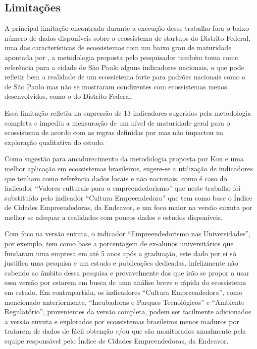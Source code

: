 \subsection{Limitações}
\label{subsection:limitações}

A principal limitação encontrada durante a execução desse trabalho fora o baixo número de dados disponíveis sobre o ecossistema de startups do Distrito Federal, uma das características de ecossistemas com um baixo grau de maturidade apontada por , a metodologia proposta pelo pesquisador também toma como referência para a cidade de São Paulo alguns indicadores nacionais, o que pode refletir bem a realidade de um ecossistema forte para padrões nacionais como o de São Paulo mas não se mostraram condizentes com ecossistemas menos desenvolvidos, como o do Distrito Federal.

Essa limitação refletiu na supressão de 13 indicadores sugeridos pela metodologia completa e impediu a mensuração de um nível de maturidade geral para o ecossistema de acordo com as regras definidas por  mas não impactou na exploração qualitativa do estudo.

Como sugestão para amadurecimento da metodologia proposta por Kon e uma melhor aplicação em ecossistemas brasileiros, sugere-se a utilização de indicadores que tenham como referência dados locais e não nacionais, como é caso do indicador ``Valores culturais para o empreendedorismo'' que neste trabalho foi substituído pelo indicador ``Cultura Empreendedora'' que tem como base o Índice de Cidades Empreendedoras, da Endeavor, e um foco maior na versão enxuta por melhor se adequar a realidades com poucos dados e estudos disponíveis. 

Com foco na versão enxuta, o indicador ``Empreendedorismo nas Universidades'', por exemplo, tem como base a porcentagem de ex-alunos universitários que fundaram uma empresa em até 5 anos após a graduação, este dado por si só justifica uma pesquisa e um estudo e publicações dedicadas, infelizmente não cabendo ao âmbito dessa pesquisa e provavelmente das que irão se propor a usar essa versão por estarem em busca de uma análise breve e rápida do ecossistema em estudo. Em contrapartida, os indicadores ``Cultura Empreendedora'', como mencionado anteriormente, ``Incubadoras e Parques Tecnológicos'' e ``Ambiente Regulatório'', provenientes da versão completa, podem ser facilmente adicionados a versão enxuta e explorados por ecossistemas brasileiros menos maduros por tratarem de dados de fácil obtenção e/ou que são monitorados anualmente pela equipe responsável pelo Índice de Cidades Empreendedoras, da Endeavor.

